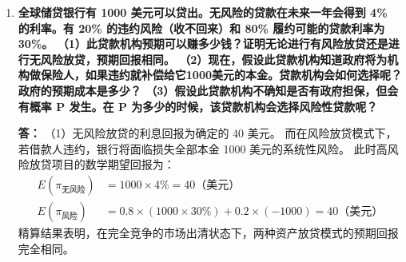 \begin{enumerate}[label=\textbf{\arabic*.}, leftmargin=*]
		\textbf{答：} （1）在这种惩罚性固定工资契约下，工人的净工资函数表现为分段形式。
		当努力水平达到边界时，工人获取最大化净收益：
		\[
		w_n = \begin{cases} 2 - e, & e \ge 1 \\ -e, & e < 1 \end{cases}
		\]
		理性工人只需满足最低合规要求，即选择最低努力水平 $e = 1$。此时厂商获得的最终利润为：
		\[
		\pi = 10 \times 1 - 1^2 - 2 = 7
		\]
		该模式由于缺乏超额边际激励，工人毫无增加努力的动力，因而无法实现更高的生产效率。
		
		（2）在比例分成契约下，工人的收益与厂商的整体产出相挂钩。
		此时工人的目标函数转化为关于努力水平的二次函数：
		\[
		w_n = \frac{1}{2}(10e - e^2) - e = 4e - 0.5e^2
		\]
		根据利润最大化的一阶条件，令导数为零即可解得工人的最优努力水平：
		\[
		\frac{dw_n}{de} = 4 - e = 0 \implies e = 4
		\]
		此时厂商享有一半的剩余收益，其最终斩获的利润水平为：
		\[
		\pi = \frac{1}{2} R = 5 \times 4 - 0.5 \times 4^2 = 12
		\]
		此项设计使得工人与厂商利益共沾，引致工人自发提高努力程度，促使厂商利润实现明显增长。
		
		（3）在固定租金契约下，工人支付完固定留存基数后成为在边际上承担完全风险的剩余索取者。
		工人的净工资目标函数可以写为：
		\[
		w_n = (10e - e^2) - 12.5 - e = 9e - e^2 - 12.5
		\]
		根据一阶优化条件进行推导，能够直接锁定工人的最优努力供给水平：
		\[
		\frac{dw_n}{de} = 9 - 2e = 0 \implies e = 4.5
		\]
		此时厂商固定的资产出租净利润即为扣除了努力激励成本后的固定数额：
		\[
		\pi = R - (R - 12.5) = 12.5
		\]
		这一关系彻底消除了边际扭曲，工人释放出最高的努力水平，从而帮助委托人锁定了最大化的确定性收益。
		\newpage
		\item \textbf{全球储贷银行有 1000 美元可以贷出。无风险的贷款在未来一年会得到 4\% 的利率。有 20\% 的违约风险（收不回来）和 80\% 履约可能的贷款利率为 30\%。
			（1）此贷款机构预期可以赚多少钱？证明无论进行有风险放贷还是进行无风险放贷，预期回报相同。
			（2）现在，假设此贷款机构知道政府将为机构做保险人，如果违约就补偿给它1000美元的本金。贷款机构会如何选择呢？政府的预期成本是多少？
			（3）假设此贷款机构不确知是否有政府担保，但会有概率 P 发生。在 P 为多少的时候，该贷款机构会选择风险性贷款呢？}
		
		\textbf{答：} （1）无风险放贷的利息回报为确定的 40 美元。
		而在风险放贷模式下，若借款人违约，银行将面临损失全部本金 1000 美元的系统性风险。
		此时高风险放贷项目的数学期望回报为：
		\[
		\begin{aligned}
			E(\pi_{\text{无风险}}) &= 1000 \times 4\% = 40 \text{（美元）} \\
			E(\pi_{\text{风险}}) &= 0.8 \times (1000 \times 30\%) + 0.2 \times (-1000) = 40 \text{（美元）}
		\end{aligned}
		\]
		精算结果表明，在完全竞争的市场出清状态下，两种资产放贷模式的预期回报完全相同。
		

\end{enumerate}
